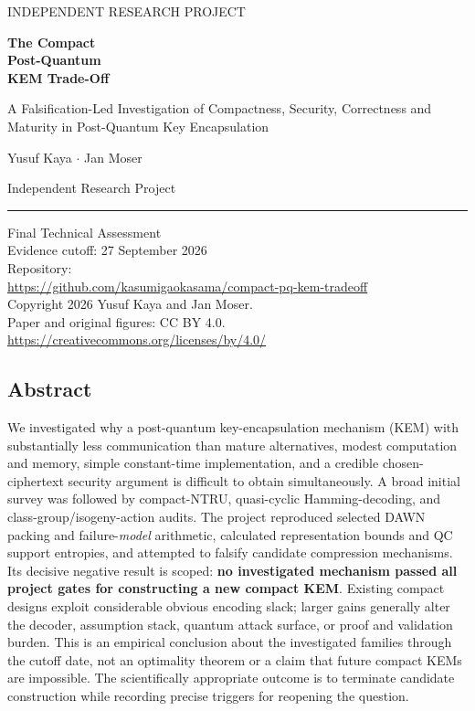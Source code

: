 \documentclass[
  10pt,
  a4paper,
]{article}
\author{}
\date{}
\begin{document}
\begin{titlepage}
\thispagestyle{empty}
\vspace*{1.4cm}
{\sffamily\small INDEPENDENT RESEARCH PROJECT\par}
\vspace{1.2cm}
{\sffamily\bfseries\fontsize{30}{35}\selectfont The Compact\\Post-Quantum\\KEM Trade-Off\par}
\vspace{.9cm}
{\Large\raggedright A Falsification-Led Investigation of Compactness, Security, Correctness and Maturity in Post-Quantum Key Encapsulation\par}
\vspace{1.4cm}
{\Large Yusuf Kaya $\cdot$ Jan Moser\par}
\vspace{.35cm}
Independent Research Project\par
\vfill
\hrule\vspace{.5cm}
\textsf{Final Technical Assessment}\\[5pt]
Evidence cutoff: 27 September 2026\\[16pt]
\small Repository:\\
\url{https://github.com/kasumigaokasama/compact-pq-kem-tradeoff}\\[16pt]
Copyright 2026 Yusuf Kaya and Jan Moser.\\
Paper and original figures: CC BY 4.0.\\
\url{https://creativecommons.org/licenses/by/4.0/}
\end{titlepage}

\hypertarget{abstract}{%
\subsection{Abstract}\label{abstract}}

We investigated why a post-quantum key-encapsulation mechanism (KEM)
with substantially less communication than mature alternatives, modest
computation and memory, simple constant-time implementation, and a
credible chosen-ciphertext security argument is difficult to obtain
simultaneously. A broad initial survey was followed by compact-NTRU,
quasi-cyclic Hamming-decoding, and class-group/isogeny-action audits.
The project reproduced selected DAWN packing and failure-\emph{model}
arithmetic, calculated representation bounds and QC support entropies,
and attempted to falsify candidate compression mechanisms. Its decisive
negative result is scoped: \textbf{no investigated mechanism passed all
project gates for constructing a new compact KEM}. Existing compact
designs exploit considerable obvious encoding slack; larger gains
generally alter the decoder, assumption stack, quantum attack surface,
or proof and validation burden. This is an empirical conclusion about
the investigated families through the cutoff date, not an optimality
theorem or a claim that future compact KEMs are impossible. The
scientifically appropriate outcome is to terminate candidate
construction while recording precise triggers for reopening the
question.
\end{document}
